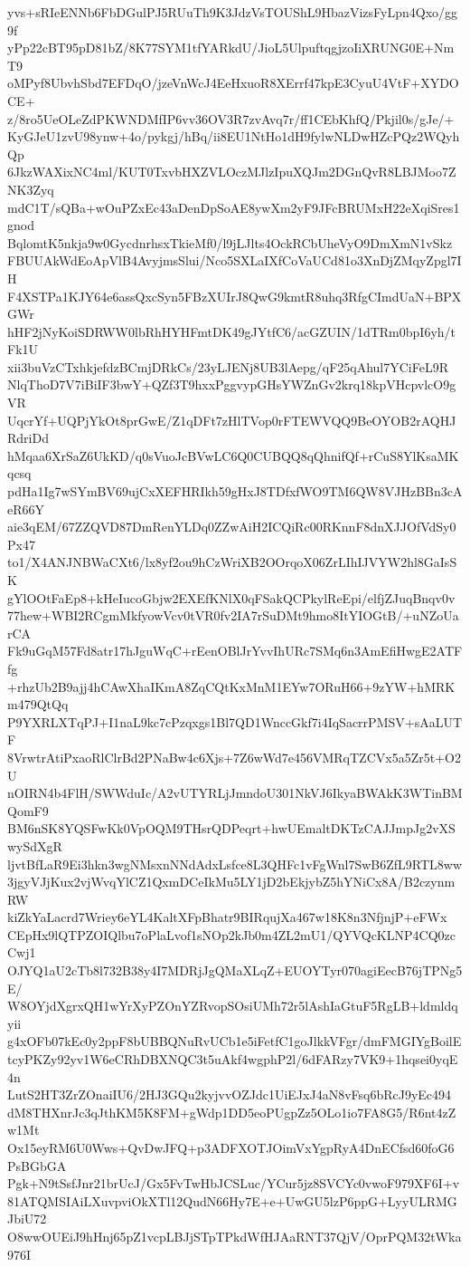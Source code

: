 yvs+sRIeENNb6FbDGulPJ5RUuTh9K3JdzVsTOUShL9HbazVizsFyLpn4Qxo/gg9f
yPp22cBT95pD81bZ/8K77SYM1tfYARkdU/JioL5UlpuftqgjzoIiXRUNG0E+NmT9
oMPyf8UbvhSbd7EFDqO/jzeVnWcJ4EeHxuoR8XErrf47kpE3CyuU4VtF+XYDOCE+
z/8ro5UeOLeZdPKWNDMfIP6vv36OV3R7zvAvq7r/ff1CEbKhfQ/Pkjil0s/gJe/+
KyGJeU1zvU98ynw+4o/pykgj/hBq/ii8EU1NtHo1dH9fylwNLDwHZcPQz2WQyhQp
6JkzWAXixNC4ml/KUT0TxvbHXZVLOczMJlzIpuXQJm2DGnQvR8LBJMoo7ZNK3Zyq
mdC1T/sQBa+wOuPZxEc43aDenDpSoAE8ywXm2yF9JFcBRUMxH22eXqiSres1gnod
BqlomtK5nkja9w0GycdnrhsxTkieMf0/l9jLJlts4OckRCbUheVyO9DmXmN1vSkz
FBUUAkWdEoApVlB4AvyjmsSlui/Nco5SXLaIXfCoVaUCd81o3XnDjZMqyZpgl7IH
F4XSTPa1KJY64e6assQxcSyn5FBzXUIrJ8QwG9kmtR8uhq3RfgCImdUaN+BPXGWr
hHF2jNyKoiSDRWW0lbRhHYHFmtDK49gJYtfC6/acGZUIN/1dTRm0bpI6yh/tFk1U
xii3buVzCTxhkjefdzBCmjDRkCs/23yLJENj8UB3lAepg/qF25qAhul7YCiFeL9R
NlqThoD7V7iBiIF3bwY+QZf3T9hxxPggvypGHsYWZnGv2krq18kpVHcpvlcO9gVR
UqcrYf+UQPjYkOt8prGwE/Z1qDFt7zHlTVop0rFTEWVQQ9BeOYOB2rAQHJRdriDd
hMqaa6XrSaZ6UkKD/q0sVuoJcBVwLC6Q0CUBQQ8qQhnifQf+rCuS8YlKsaMKqcsq
pdHa1Ig7wSYmBV69ujCxXEFHRIkh59gHxJ8TDfxfWO9TM6QW8VJHzBBn3cAeR66Y
aie3qEM/67ZZQVD87DmRenYLDq0ZZwAiH2ICQiRc00RKnnF8dnXJJOfVdSy0Px47
to1/X4ANJNBWaCXt6/lx8yf2ou9hCzWriXB2OOrqoX06ZrLIhIJVYW2hl8GaIsSK
gYlOOtFaEp8+kHeIucoGbjw2EXEfKNlX0qFSakQCPkylReEpi/elfjZJuqBnqv0v
77hew+WBI2RCgmMkfyowVcv0tVR0fv2IA7rSuDMt9hmo8ItYIOGtB/+uNZoUarCA
Fk9uGqM57Fd8atr17hJguWqC+rEenOBlJrYvvIhURc7SMq6n3AmEfiHwgE2ATFfg
+rhzUb2B9ajj4hCAwXhaIKmA8ZqCQtKxMnM1EYw7ORuH66+9zYW+hMRKm479QtQq
P9YXRLXTqPJ+I1naL9kc7cPzqxgs1Bl7QD1WnccGkf7i4IqSacrrPMSV+sAaLUTF
8VrwtrAtiPxaoRlClrBd2PNaBw4c6Xjs+7Z6wWd7e456VMRqTZCVx5a5Zr5t+O2U
nOIRN4b4FlH/SWWduIc/A2vUTYRLjJmndoU301NkVJ6IkyaBWAkK3WTinBMQomF9
BM6nSK8YQSFwKk0VpOQM9THsrQDPeqrt+hwUEmaltDKTzCAJJmpJg2vXSwySdXgR
ljvtBfLaR9Ei3hkn3wgNMsxnNNdAdxLsfce8L3QHFc1vFgWnl7SwB6ZfL9RTL8ww
3jgyVJjKux2vjWvqYlCZ1QxmDCeIkMu5LY1jD2bEkjybZ5hYNiCx8A/B2czynmRW
kiZkYaLacrd7Wriey6eYL4KaltXFpBhatr9BIRqujXa467w18K8n3NfjnjP+eFWx
CEpHx9lQTPZOIQlbu7oPlaLvof1sNOp2kJb0m4ZL2mU1/QYVQcKLNP4CQ0zcCwj1
OJYQ1aU2cTb8l732B38y4I7MDRjJgQMaXLqZ+EUOYTyr070agiEecB76jTPNg5E/
W8OYjdXgrxQH1wYrXyPZOnYZRvopSOsiUMh72r5lAshIaGtuF5RgLB+ldmldqyii
g4xOFb07kEc0y2ppF8bUBBQNuRvUCb1e5iFetfC1goJlkkVFgr/dmFMGIYgBoilE
tcyPKZy92yv1W6eCRhDBXNQC3t5uAkf4wgphP2l/6dFARzy7VK9+1hqsei0yqE4n
LutS2HT3ZrZOnaiIU6/2HJ3GQu2kyjvvOZJdc1UiEJxJ4aN8vFsq6bRcJ9yEc494
dM8THXnrJc3qJthKM5K8FM+gWdp1DD5eoPUgpZz5OLo1io7FA8G5/R6nt4zZw1Mt
Ox15eyRM6U0Wws+QvDwJFQ+p3ADFXOTJOimVxYgpRyA4DnECfsd60foG6PsBGbGA
Pgk+N9tSsfJnr21brUcJ/Gx5FvTwHbJCSLuc/YCur5jz8SVCYc0vwoF979XF6I+v
81ATQMSIAiLXuvpviOkXTl12QudN66Hy7E+e+UwGU5lzP6ppG+LyyULRMGJbiU72
O8wwOUEiJ9hHnj65pZ1vcpLBJjSTpTPkdWfHJAaRNT37QjV/OprPQM32tWka976I
